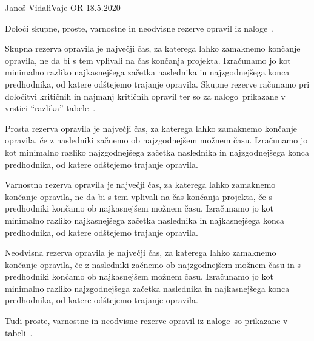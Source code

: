 \begin{naloga}{Janoš Vidali}{Vaje OR 18.5.2020}
\begin{vprasanje}
Določi skupne, proste, varnostne in neodvisne rezerve
opravil iz naloge~\nal[palacinke].
\end{vprasanje}

\begin{odgovor}
Skupna rezerva opravila je največji čas,
za katerega lahko zamaknemo končanje opravila,
ne da bi s tem vplivali na čas končanja projekta.
Izračunamo jo kot minimalno razliko najkasnejšega začetka naslednika
in najzgodnejšega konca predhodnika,
od katere odštejemo trajanje opravila.
Skupne rezerve računamo pri določitvi kritičnih in najmanj kritičnih opravil
ter so za nalogo~\nal[palacinke]
prikazane v vrstici ``razlika'' tabele~.

Prosta rezerva opravila je največji čas,
za katerega lahko zamaknemo končanje opravila,
če z nasledniki začnemo ob najzgodnejšem možnem času.
Izračunamo jo kot minimalno razliko najzgodnejšega začetka naslednika
in najzgodnejšega konca predhodnika,
od katere odštejemo trajanje opravila.

Varnostna rezerva opravila je največji čas,
za katerega lahko zamaknemo končanje opravila,
ne da bi s tem vplivali na čas končanja projekta,
če s predhodniki končamo ob najkasnejšem možnem času.
Izračunamo jo kot minimalno razliko najkasnejšega začetka naslednika
in najkasnejšega konca predhodnika,
od katere odštejemo trajanje opravila.

Neodvisna rezerva opravila je največji čas,
za katerega lahko zamaknemo končanje opravila,
če z nasledniki začnemo ob najzgodnejšem možnem času
in s predhodniki končamo ob najkasnejšem možnem času.
Izračunamo jo kot minimalno razliko najzgodnejšega začetka naslednika
in najkasnejšega konca predhodnika,
od katere odštejemo trajanje opravila.

Tudi proste, varnostne in neodvisne rezerve opravil iz naloge~\nal[palacinke]
so prikazane v tabeli~.
\end{odgovor}
\end{naloga}
